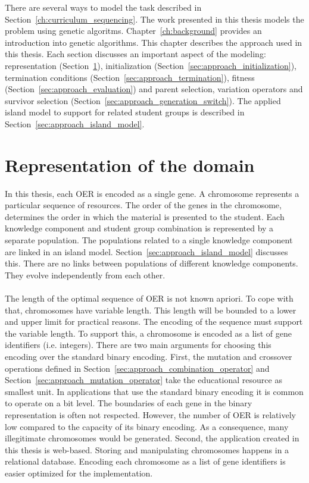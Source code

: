 There are several ways to model the task described in
Section~\ref{ch:curriculum_sequencing}. The work presented in this thesis models the
problem using genetic algoritms. Chapter~\ref{ch:background} provides an
introduction into genetic algorithms. This chapter describes the approach used
in this thesis. Each section discusses an important aspect of the modeling: representation
(Section~\ref{sec:approach_representation}), initialization
(Section~\ref{sec:approach_initialization}), termination conditions
(Section~\ref{sec:approach_termination}), fitness
(Section~\ref{sec:approach_evaluation}) and parent selection, variation
operators and survivor selection
(Section~\ref{sec:approach_generation_switch}). The applied island model to
support for related student groups is described in
Section~\ref{sec:approach_island_model}.

\section{Representation of the domain}
\label{sec:approach_representation}
In this thesis, each OER is encoded as a single gene. A
chromosome represents a particular sequence of resources. The order of the
genes in the chromosome, determines the order in which the material is presented to
the student. Each knowledge component and student group combination is represented
by a separate population. The populations related to a single knowledge
component are linked in an island model.
Section~\ref{sec:approach_island_model} discusses this. There are no links
between populations of different knowledge components. They evolve
independently from each other.\\\\
\noindent
The length of the optimal sequence of OER is not known apriori. To cope with
that, chromosomes have variable length. This length will be
bounded to a lower and upper limit for practical reasons. The encoding of the
sequence must support the variable length. To support this, a chromosome is
encoded as a list of gene identifiers (i.e. integers).  There are two main
arguments for choosing this encoding over the standard binary encoding.
First, the mutation and crossover operations defined in Section~\ref{sec:approach_combination_operator}
and Section~\ref{sec:approach_mutation_operator}
take the educational resource as smallest unit. In applications that use the
standard binary encoding it is common to operate on a bit level. The boundaries
of each gene in the binary representation is often not respected. However, the
number of OER is relatively low compared to the capacity of its binary
encoding. As a consequence, many illegitimate chromosomes would be generated.
Second, the application created in this thesis is web-based. Storing and
manipulating chromosomes happens in a relational database. Encoding each
chromosome as a list of gene identifiers is easier optimized for the
implementation.


